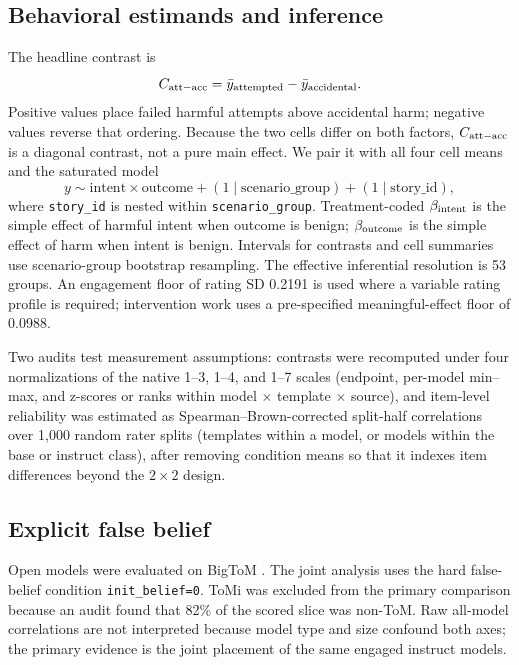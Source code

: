 \subsection{Behavioral estimands and inference}

The headline contrast is
\begin{equation}
    C_{\mathrm{att-acc}} = \bar{y}_{\mathrm{attempted}}-\bar{y}_{\mathrm{accidental}}.
\end{equation}
Positive values place failed harmful attempts above accidental harm; negative values reverse that ordering.
Because the two cells differ on both factors, $C_{\mathrm{att-acc}}$ is a diagonal contrast, not a pure main effect.
We pair it with all four cell means and the saturated model
\begin{equation}
    y \sim \mathrm{intent}\times\mathrm{outcome}
      +(1\mid\mathrm{scenario\_group})+(1\mid\mathrm{story\_id}),
\end{equation}
where \texttt{story\_id} is nested within \texttt{scenario\_group}.
Treatment-coded $\beta_{\mathrm{intent}}$ is the simple effect of harmful intent when outcome is benign; $\beta_{\mathrm{outcome}}$ is the simple effect of harm when intent is benign.
Intervals for contrasts and cell summaries use scenario-group bootstrap resampling.
The effective inferential resolution is 53 groups.
An engagement floor of rating SD 0.2191 is used where a variable rating profile is required; intervention work uses a pre-specified meaningful-effect floor of 0.0988.

Two audits test measurement assumptions: contrasts were recomputed under four normalizations of the native 1--3, 1--4, and 1--7 scales (endpoint, per-model min--max, and z-scores or ranks within model $\times$ template $\times$ source), and item-level reliability was estimated as Spearman--Brown-corrected split-half correlations over 1{,}000 random rater splits (templates within a model, or models within the base or instruct class), after removing condition means so that it indexes item differences beyond the $2\times2$ design.

\subsection{Explicit false belief}

Open models were evaluated on BigToM \citep{gandhi2023bigtom}.
The joint analysis uses the hard false-belief condition \texttt{init\_belief=0}.
ToMi was excluded from the primary comparison because an audit found that 82\% of the scored slice was non-ToM.
Raw all-model correlations are not interpreted because model type and size confound both axes; the primary evidence is the joint placement of the same engaged instruct models.

